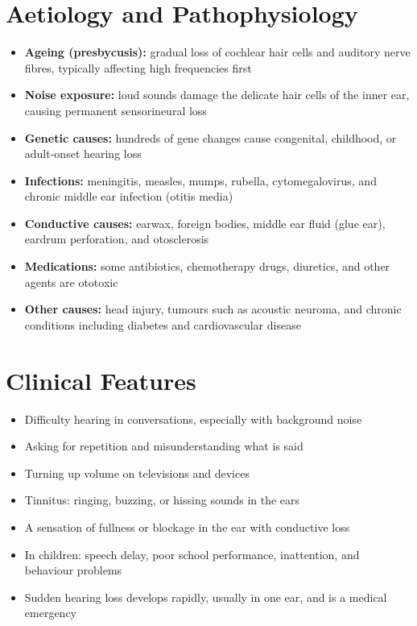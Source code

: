 \section*{Aetiology and Pathophysiology}
\begin{itemize}
    \item \textbf{Ageing (presbycusis):} gradual loss of cochlear hair cells and auditory nerve fibres, typically affecting high frequencies first
    \item \textbf{Noise exposure:} loud sounds damage the delicate hair cells of the inner ear, causing permanent sensorineural loss
    \item \textbf{Genetic causes:} hundreds of gene changes cause congenital, childhood, or adult-onset hearing loss
    \item \textbf{Infections:} meningitis, measles, mumps, rubella, cytomegalovirus, and chronic middle ear infection (otitis media)
    \item \textbf{Conductive causes:} earwax, foreign bodies, middle ear fluid (glue ear), eardrum perforation, and otosclerosis
    \item \textbf{Medications:} some antibiotics, chemotherapy drugs, diuretics, and other agents are ototoxic
    \item \textbf{Other causes:} head injury, tumours such as acoustic neuroma, and chronic conditions including diabetes and cardiovascular disease
\end{itemize}

\section*{Clinical Features}
\begin{itemize}
    \item Difficulty hearing in conversations, especially with background noise
    \item Asking for repetition and misunderstanding what is said
    \item Turning up volume on televisions and devices
    \item Tinnitus: ringing, buzzing, or hissing sounds in the ears
    \item A sensation of fullness or blockage in the ear with conductive loss
    \item In children: speech delay, poor school performance, inattention, and behaviour problems
    \item Sudden hearing loss develops rapidly, usually in one ear, and is a medical emergency
\end{itemize}

